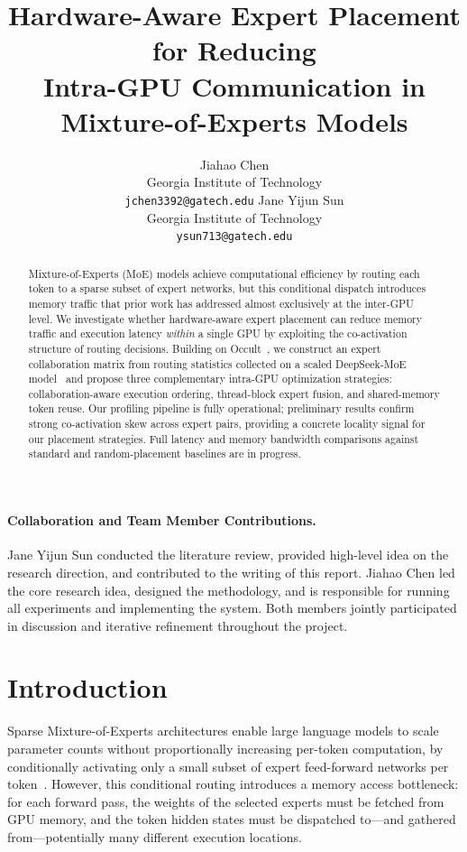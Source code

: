 \documentclass{article}
\title{Hardware-Aware Expert Placement for Reducing\\
Intra-GPU Communication in Mixture-of-Experts Models}
\author{Jiahao Chen \\
Georgia Institute of Technology \\
\texttt{jchen3392@gatech.edu}
\And
Jane Yijun Sun \\
Georgia Institute of Technology \\
\texttt{ysun713@gatech.edu}
}
\begin{document}
\maketitle
 
\paragraph{Collaboration and Team Member Contributions.}
Jane Yijun Sun conducted the literature review, provided high-level idea on the
research direction, and contributed to the writing of this report.
Jiahao Chen led the core research idea, designed the methodology, and is responsible
for running all experiments and implementing the system.
Both members jointly participated in discussion and iterative refinement throughout
the project.
 
\begin{abstract}
Mixture-of-Experts (MoE) models achieve computational efficiency by routing each token
to a sparse subset of expert networks, but this conditional dispatch introduces memory
traffic that prior work has addressed almost exclusively at the inter-GPU level.
We investigate whether hardware-aware expert placement can reduce memory traffic and
execution latency \emph{within} a single GPU by exploiting the co-activation structure
of routing decisions.
Building on Occult~\citep{luo2025occult}, we construct an expert collaboration matrix
from routing statistics collected on a scaled DeepSeek-MoE model~\citep{deepseek2024}
and propose three complementary intra-GPU optimization strategies: collaboration-aware
execution ordering, thread-block expert fusion, and shared-memory token reuse.
Our profiling pipeline is fully operational; preliminary results confirm strong
co-activation skew across expert pairs, providing a concrete locality signal for our
placement strategies. Full latency and memory bandwidth comparisons against standard
and random-placement baselines are in progress.
\end{abstract}
 
\section{Introduction}
 
Sparse Mixture-of-Experts architectures enable large language models to scale parameter
counts without proportionally increasing per-token computation, by conditionally
activating only a small subset of expert feed-forward networks per
token~\citep{shazeer2017outrageously,fedus2022switch}.
However, this conditional routing introduces a memory access bottleneck: for each
forward pass, the weights of the selected experts must be fetched from GPU memory,
and the token hidden states must be dispatched to—and gathered from—potentially many
different execution locations.
 
\end{document}
